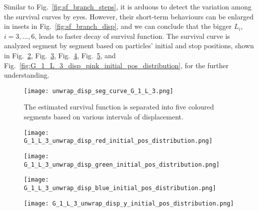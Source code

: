       Similar to Fig.~\ref{fig:sf_branch_steps}, it is arduous to
      detect the variation among the survival curves by eyes. However,
      their short-term behaviours can be enlarged in insets in
      Fig.~\ref{fig:sf_branch_disp}, and we can conclude that the
      bigger $L_i$, $i=3, ..., 6$, leads to faster decay of survival
      function. The survival curve is analyzed segment by segment
      based on particles' initial and stop positions, shown in
      Fig.~\ref{fig:G_1_L_3_disp_red_initial_pos_distribution},
      Fig.~\ref{fig:G_1_L_3_disp_green_initial_pos_distribution},
      Fig.~\ref{fig:G_1_L_3_disp_blue_initial_pos_distribution},
      Fig.~\ref{fig:G_1_L_3_disp_yellow_initial_pos_distribution}, and
      Fig.~\ref{fig:G_1_L_3_disp_pink_initial_pos_distribution}, for
      the further understanding.
      


      \begin{figure}
         \centering
         \texttt{[image: unwrap\_disp\_seg\_curve\_G\_1\_L\_3.png]}
         \caption{The estimated survival function is separated into
           five coloured segments based on various intervals of
           displacement.}
         \label{fig:disp_seg_curve_G_1_L_3}
      \end{figure}

      
       \begin{figure}
         \centering
         \texttt{[image: G\_1\_L\_3\_unwrap\_disp\_red\_initial\_pos\_distribution.png]}
         \caption{}
         \label{fig:G_1_L_3_disp_red_initial_pos_distribution}
       \end{figure}


       \begin{figure}
         \centering
         \texttt{[image: G\_1\_L\_3\_unwrap\_disp\_green\_initial\_pos\_distribution.png]}
         \caption{}
         \label{fig:G_1_L_3_disp_green_initial_pos_distribution}
       \end{figure}


        \begin{figure}
         \centering
         \texttt{[image: G\_1\_L\_3\_unwrap\_disp\_blue\_initial\_pos\_distribution.png]}
         \caption{}
         \label{fig:G_1_L_3_disp_blue_initial_pos_distribution}
        \end{figure}


        \begin{figure}
         \centering
         \texttt{[image: G\_1\_L\_3\_unwrap\_disp\_y\_initial\_pos\_distribution.png]}
         \caption{}
         \label{fig:G_1_L_3_disp_yellow_initial_pos_distribution}
        \end{figure}



